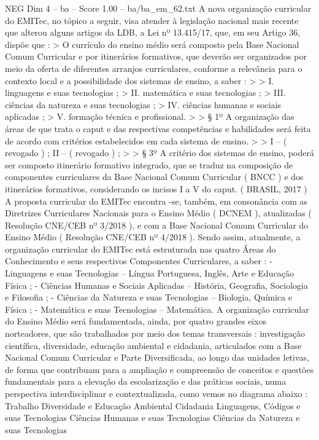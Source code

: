 \begin{textsample}{NEG Dim 4 – ba – Score 1.00 – ba/ba\_em\_62.txt}
A nova organização curricular do EMITec, no tópico a seguir, visa atender à legislação nacional mais recente que alterou alguns artigos da LDB, a Lei nº 13.415/17, que, em seu Artigo 36, dispõe que : > O currículo do ensino médio será composto pela Base Nacional Comum Curricular e por itinerários formativos, que deverão ser organizados por meio da oferta de diferentes arranjos curriculares, conforme a relevância para o contexto local e a possibilidade dos sistemas de ensino, a saber : > > I. linguagens e suas tecnologias ; > II. matemática e suas tecnologias ; > III. ciências da natureza e suas tecnologias ; > IV. ciências humanas e sociais aplicadas ; > V. formação técnica e profissional. > > § 1º A organização das áreas de que trata o caput e das respectivas competências e habilidades será feita de acordo com critérios estabelecidos em cada sistema de ensino. > > I – ( revogado ) ; II – ( revogado ) ; > > § 3º A critério dos sistemas de ensino, poderá ser composto itinerário formativo integrado, que se traduz na composição de componentes curriculares da Base Nacional Comum Curricular ( BNCC ) e dos itinerários formativos, considerando os incisos I a V do caput. ( BRASIL, 2017 ) A proposta curricular do EMITec encontra -se, também, em consonância com as Diretrizes Curriculares Nacionais para o Ensino Médio ( DCNEM ), atualizadas ( Resolução CNE/CEB nº 3/2018 ), e com a Base Nacional Comum Curricular do Ensino Médio ( Resolução CNE/CEB nº 4/2018 ).
Sendo assim, atualmente, a organização curricular do EMITec está estruturada nas quatro Áreas do Conhecimento e seus respectivos Componentes Curriculares, a saber : - Linguagens e suas Tecnologias – Língua Portuguesa, Inglês, Arte e Educação Física ; - Ciências Humanas e Sociais Aplicadas – História, Geografia, Sociologia e Filosofia ; - Ciências da Natureza e suas Tecnologias – Biologia, Química e Física ; - Matemática e suas Tecnologias – Matemática.
A organização curricular do Ensino Médio será fundamentada, ainda, por quatro grandes eixos norteadores, que são trabalhados por meio dos temas transversais : investigação científica, diversidade, educação ambiental e cidadania, articulados com a Base Nacional Comum Curricular e Parte Diversificada, ao longo das unidades letivas, de forma que contribuam para a ampliação e compreensão de conceitos e questões fundamentais para a elevação da escolarização e das práticas sociais, numa perspectiva interdisciplinar e contextualizada, como vemos no diagrama abaixo : Trabalho Diversidade e Educação Ambiental Cidadania Linguagens, Códigos e suas Tecnologias Ciências Humanas e suas Tecnologias Ciências da Natureza e suas Tecnologias

\end{textsample}
